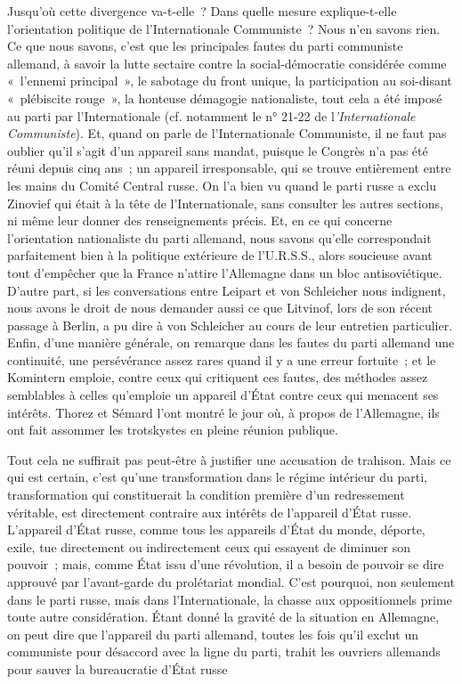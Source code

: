 \documentclass[french,twoside]{book} %
\begin{document}
Jusqu'où cette divergence va-t-elle ? Dans quelle mesure explique-t-elle l'orientation politique de l'Internationale Communiste ? Nous n'en savons rien. Ce que nous savons, c'est que les principales fautes du parti communiste allemand, à savoir la lutte sectaire contre la social-démocratie considérée comme « l'ennemi principal », le sabotage du front unique, la participation au soi-disant « plébiscite rouge », la honteuse démagogie nationaliste, tout cela a été imposé au parti par l'Internationale (cf. notamment le n° 21-22 de l{\itshape 'Inter­nationale Communiste}). Et, quand on parle de l'Internationale Communiste, il ne faut pas oublier qu'il s'agit d'un appareil sans mandat, puisque le Congrès n'a pas été réuni depuis cinq ans ; un appareil irresponsable, qui se trouve entièrement entre les mains du Comité Central russe. On l'a bien vu quand le parti russe a exclu Zinovief qui était à la tête de l'Internationale, sans consulter les autres sections, ni même leur donner des renseignements précis. Et, en ce qui concerne l'orientation nationaliste du parti allemand, nous savons qu'elle correspondait parfaitement bien à la politique extérieure de l'U.R.S.S., alors soucieuse avant tout d'empêcher que la France n'attire l'Allemagne dans un bloc antisoviétique. D'autre part, si les conversations entre Leipart et von Schleicher nous indignent, nous avons le droit de nous demander aussi ce que Litvinof, lors de son récent passage à Berlin, a pu dire à von Schleicher au cours de leur entretien particulier. Enfin, d'une manière générale, on remarque dans les fautes du parti allemand une continuité, une persévérance assez rares quand il y a une erreur fortuite ; et le Komintern emploie, contre ceux qui critiquent ces fautes, des méthodes assez semblables à celles qu'emploie un appareil d'État contre ceux qui menacent ses intérêts. Thorez et Sémard l'ont montré le jour où, à propos de l'Allemagne, ils ont fait assommer les trotskystes en pleine réunion publique.\par
Tout cela ne suffirait pas peut-être à justifier une accusation de trahison. Mais ce qui est certain, c'est qu'une transformation dans le régime intérieur du parti, transformation qui constituerait la condition première d'un redressement véritable, est directement contraire aux intérêts de l'appareil d'État russe. L'appareil d'État russe, comme tous les appareils d'État du monde, déporte, exile, tue directement ou indirectement ceux qui essayent de diminuer son pouvoir ; mais, comme État issu d'une révolution, il a besoin de pouvoir se dire approuvé par l'avant-garde du prolétariat mondial. C'est pourquoi, non seulement dans le parti russe, mais dans l'Internationale, la chasse aux oppo­sitionnels prime toute autre considération. Étant donné la gravité de la situation en Allemagne, on peut dire que l'appareil du parti allemand, toutes les fois qu'il exclut un communiste pour désaccord avec la ligne du parti, trahit les ouvriers allemands pour sauver la bureaucratie d'État russe\par
\end{document}
